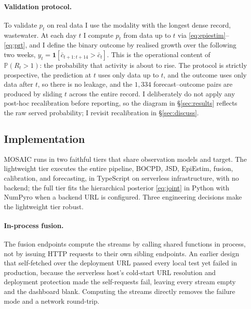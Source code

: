 \documentclass[10pt,twocolumn]{article}
\theoremstyle{definition}
\newcommand{\Rt}{R_t}
\newcommand{\Prob}{\mathbb{P}}
\begin{document}
\paragraph{Validation protocol.}
To validate $p_t$ on real data I use the modality with the longest dense record,
wastewater. At each day $t$ I compute $p_t$ from data up to $t$ via
\eqref{eq:epiestim}--\eqref{eq:prt}, and I define the binary outcome by realised
growth over the following two weeks, $y_t=\mathbf 1[\bar c_{t+1:t+14}>\bar c_t]$.
This is the operational content of $\Prob(\Rt>1)$: the probability that activity
is about to rise. The protocol is strictly prospective, the prediction at $t$
uses only data up to $t$, and the outcome uses only data after $t$, so there is
no leakage, and the $1{,}334$ forecast--outcome pairs are produced by sliding $t$
across the entire record. I deliberately do not apply any post-hoc
recalibration before reporting, so the diagram in \S\ref{sec:results} reflects the
raw served probability; I revisit recalibration in \S\ref{sec:discuss}.

\subsection{Implementation}
\label{sec:impl}

MOSAIC runs in two faithful tiers that share observation models and target. The
lightweight tier executes the entire pipeline, BOCPD, JSD, EpiEstim,
fusion, calibration, and forecasting, in TypeScript on serverless
infrastructure, with no backend; the full tier fits the hierarchical
posterior \eqref{eq:joint} in Python with NumPyro when a backend URL is
configured. Three engineering decisions make the lightweight tier robust.

\paragraph{In-process fusion.}
The fusion endpoints compute the streams by calling shared functions in process,
not by issuing HTTP requests to their own sibling endpoints. An earlier design
that self-fetched over the deployment URL passed every local test yet failed in
production, because the serverless host's cold-start URL resolution and
deployment protection made the self-requests fail, leaving every stream empty and
the dashboard blank. Computing the streams directly removes the failure mode and
a network round-trip.
\end{document}
